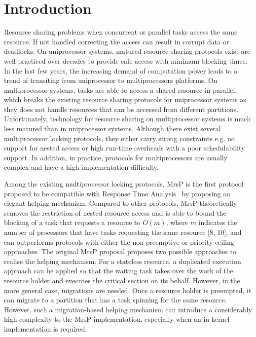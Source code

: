 \documentclass{report}
\begin{document}
\chapter{Introduction}
\label{Section_Introduction}
Resource sharing problems when concurrent or parallel tasks access the same resource. If not handled correcting the access can result in corrupt data or deadlocks.
On uniprocessor systems, matured resource sharing protocols exist are well-practiced over decades to provide safe access with minimum blocking times. In the last few years, the increasing demand of computation power leads to a trend of transiting from uniprocessor to multiprocessors platforms. On multiprocessor systems, tasks are able to access a shared resource in parallel, which breaks the existing resource sharing protocols for uniprocessor systems as they does not handle resources that can be accessed from different partitions. Unfortunately, technology for resource sharing on multiprocessor systems is much less matured than in uniprocessor systems. Although there exist several multiprocessor locking protocols, they either carry strong constraints e.g. no support for nested access or high run-time overheads with a poor schedulability support. In addition, in practice, protocols for multiprocessors are usually complex and have a high implementation difficulty. 

Among the existing multiprocessor locking protocols, MrsP is the first protocol proposed to be compatible with Response Time Analysis~\cite{audsley1993applying} by proposing an elegant helping mechanism. Compared to other protocols, MrsP theoretically removes the restriction of nested resource access and is able to bound the blocking of a task that requests a resource to $O(m)$, where $m$ indicates the number of processors that have tasks requesting the same resource [8, 10], and can outperforms protocols with either the non-preemptive or priority ceiling approaches. The original MrsP proposal proposes two possible approaches to realise the helping mechanism. For a stateless resource, a duplicated execution approach can be applied so that the waiting task takes over the work of the resource holder and executes the critical section on its behalf. However, in the more general case, migrations are needed. Once a resource holder is preempted, it can migrate to a partition that has a task spinning for the same resource. However, such a migration-based helping mechanism can introduce a considerably high complexity to the MrsP implementation, especially when an in-kernel implementation is required.
\end{document}
